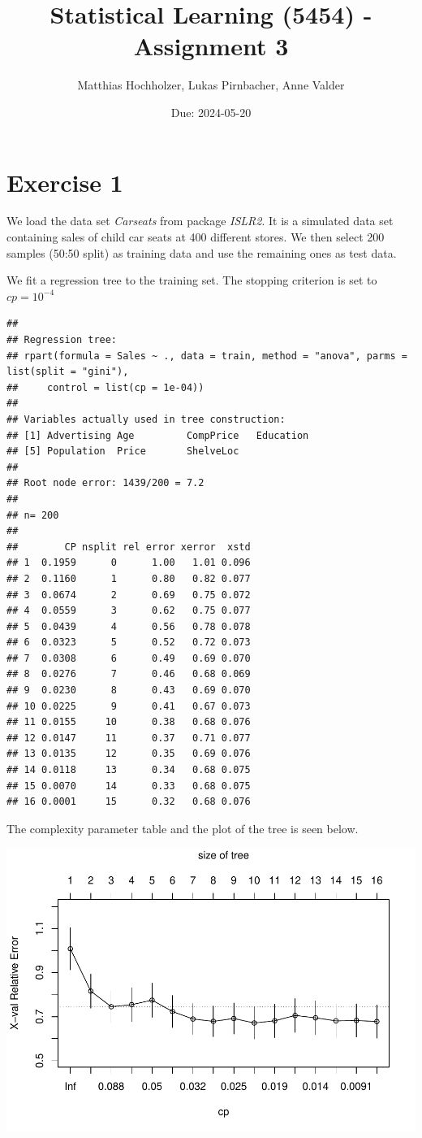 \documentclass[
]{article}
\title{Statistical Learning (5454) - Assignment 3}
\author{Matthias Hochholzer, Lukas Pirnbacher, Anne Valder}
\date{Due: 2024-05-20}
\begin{document}
\maketitle

\section{Exercise 1}\label{exercise-1}

We load the data set \textit{Carseats} from package \textit{ISLR2}. It
is a simulated data set containing sales of child car seats at 400
different stores. We then select 200 samples (50:50 split) as training
data and use the remaining ones as test data.

We fit a regression tree to the training set. The stopping criterion is
set to \(cp = 10^{-4}\)

\begin{verbatim}
## 
## Regression tree:
## rpart(formula = Sales ~ ., data = train, method = "anova", parms = list(split = "gini"), 
##     control = list(cp = 1e-04))
## 
## Variables actually used in tree construction:
## [1] Advertising Age         CompPrice   Education  
## [5] Population  Price       ShelveLoc  
## 
## Root node error: 1439/200 = 7.2
## 
## n= 200 
## 
##        CP nsplit rel error xerror  xstd
## 1  0.1959      0      1.00   1.01 0.096
## 2  0.1160      1      0.80   0.82 0.077
## 3  0.0674      2      0.69   0.75 0.072
## 4  0.0559      3      0.62   0.75 0.077
## 5  0.0439      4      0.56   0.78 0.078
## 6  0.0323      5      0.52   0.72 0.073
## 7  0.0308      6      0.49   0.69 0.070
## 8  0.0276      7      0.46   0.68 0.069
## 9  0.0230      8      0.43   0.69 0.070
## 10 0.0225      9      0.41   0.67 0.073
## 11 0.0155     10      0.38   0.68 0.076
## 12 0.0147     11      0.37   0.71 0.077
## 13 0.0135     12      0.35   0.69 0.076
## 14 0.0118     13      0.34   0.68 0.075
## 15 0.0070     14      0.33   0.68 0.075
## 16 0.0001     15      0.32   0.68 0.076
\end{verbatim}

The complexity parameter table and the plot of the tree is seen below.

\begin{center}\includegraphics{A3_files/figure-latex/unnamed-chunk-5-1} \end{center}
\end{document}
